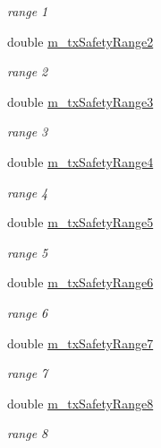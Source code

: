 \begin{DoxyCompactItemize}
\begin{DoxyCompactList}\small\item\em range 1 \end{DoxyCompactList}\item 
double \hyperlink{classVanetRoutingExperiment_ae6eed15f9f0ce82f650c646e208e2c5e}{m\+\_\+tx\+Safety\+Range2}
\begin{DoxyCompactList}\small\item\em range 2 \end{DoxyCompactList}\item 
double \hyperlink{classVanetRoutingExperiment_a5d3559c0aebe92a46501b21b57a96fad}{m\+\_\+tx\+Safety\+Range3}
\begin{DoxyCompactList}\small\item\em range 3 \end{DoxyCompactList}\item 
double \hyperlink{classVanetRoutingExperiment_a9935d9bd1426b35bf7e5921f478034a9}{m\+\_\+tx\+Safety\+Range4}
\begin{DoxyCompactList}\small\item\em range 4 \end{DoxyCompactList}\item 
double \hyperlink{classVanetRoutingExperiment_a2b3e42d76f8d74100087b633e4b9295f}{m\+\_\+tx\+Safety\+Range5}
\begin{DoxyCompactList}\small\item\em range 5 \end{DoxyCompactList}\item 
double \hyperlink{classVanetRoutingExperiment_a19582595367bfd9fde2febb9108b6fea}{m\+\_\+tx\+Safety\+Range6}
\begin{DoxyCompactList}\small\item\em range 6 \end{DoxyCompactList}\item 
double \hyperlink{classVanetRoutingExperiment_a5d3143091b54bcabaf43bea41d464bdb}{m\+\_\+tx\+Safety\+Range7}
\begin{DoxyCompactList}\small\item\em range 7 \end{DoxyCompactList}\item 
double \hyperlink{classVanetRoutingExperiment_a264dfa5219cb2bf6535743fc2906f8b1}{m\+\_\+tx\+Safety\+Range8}
\begin{DoxyCompactList}\small\item\em range 8 \end{DoxyCompactList}\item 

\end{DoxyCompactItemize}
